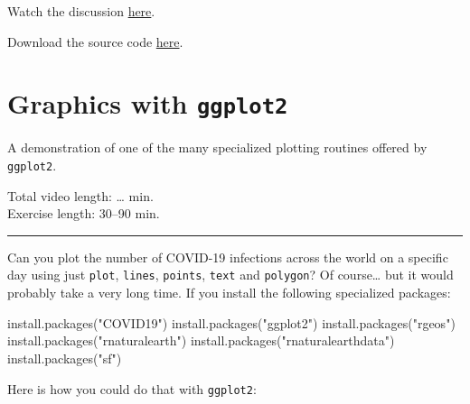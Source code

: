 \documentclass[
]{book}
\newenvironment{Shaded}{\begin{snugshade}}{\end{snugshade}}
\newcommand{\FunctionTok}[1]{\textcolor[rgb]{0.00,0.00,0.00}{#1}}
\newcommand{\NormalTok}[1]{#1}
\newcommand{\StringTok}[1]{\textcolor[rgb]{0.31,0.60,0.02}{#1}}
\begin{document}
Watch the discussion \href{https://youtu.be/ERXp51uHp2w}{here}.

Download the source code \href{files/cake-winner-AS-2021.Rmd}{here}.

\hypertarget{ggplot2}{%
\chapter{\texorpdfstring{Graphics with \texttt{ggplot2}}{Graphics with ggplot2}}\label{ggplot2}}

A demonstration of one of the many specialized plotting routines offered by \texttt{ggplot2}.

Total video length: \ldots{} min.\\
Exercise length: 30--90 min.

\begin{center}\rule{0.5\linewidth}{0.5pt}\end{center}

Can you plot the number of COVID-19 infections across the world on a specific day using just \texttt{plot}, \texttt{lines}, \texttt{points}, \texttt{text} and \texttt{polygon}? Of course\ldots{} but it would probably take a very long time. If you install the following specialized packages:

\begin{Shaded}
\begin{Highlighting}[]
\FunctionTok{install.packages}\NormalTok{(}\StringTok{"COVID19"}\NormalTok{)}
\FunctionTok{install.packages}\NormalTok{(}\StringTok{"ggplot2"}\NormalTok{)}
\FunctionTok{install.packages}\NormalTok{(}\StringTok{"rgeos"}\NormalTok{)}
\FunctionTok{install.packages}\NormalTok{(}\StringTok{"rnaturalearth"}\NormalTok{)}
\FunctionTok{install.packages}\NormalTok{(}\StringTok{"rnaturalearthdata"}\NormalTok{)}
\FunctionTok{install.packages}\NormalTok{(}\StringTok{"sf"}\NormalTok{)}
\end{Highlighting}
\end{Shaded}

Here is how you could do that with \texttt{ggplot2}:
\end{document}
